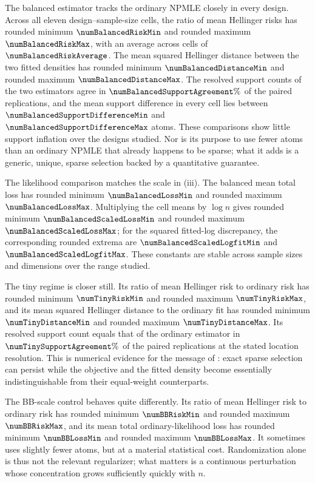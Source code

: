 \documentclass[11pt]{article}
\theoremstyle{definition}
\theoremstyle{remark}
\begin{document}
The balanced estimator tracks the ordinary NPMLE closely in every design.
Across all eleven design--sample-size cells, the ratio of mean Hellinger
risks has rounded minimum $\numBalancedRiskMin$ and rounded maximum $\numBalancedRiskMax$, with an
average across cells of $\numBalancedRiskAverage$.  The mean squared Hellinger distance
between the two fitted densities has rounded minimum $\numBalancedDistanceMin$ and
rounded maximum $\numBalancedDistanceMax$.  The resolved support counts of the two
estimators agree in $\numBalancedSupportAgreement\%$ of the \numPairedDatasets{} paired replications, and the mean
support difference in every cell lies between $\numBalancedSupportDifferenceMin$ and $\numBalancedSupportDifferenceMax$ atoms.
These comparisons show little support inflation over the designs studied.
Nor is its purpose to use fewer atoms than an ordinary NPMLE that already
happens to be sparse; what it adds is a generic, unique, sparse selection
backed by a quantitative guarantee.

The likelihood comparison matches the scale in (iii).  The
balanced mean total loss has rounded minimum $\numBalancedLossMin$ and rounded maximum
$\numBalancedLossMax$.  Multiplying the cell means by $\log n$ gives rounded minimum
$\numBalancedScaledLossMin$ and rounded maximum $\numBalancedScaledLossMax$; for the squared fitted-log discrepancy,
the corresponding rounded extrema are $\numBalancedScaledLogfitMin$ and $\numBalancedScaledLogfitMax$.  These constants
are stable across sample sizes and dimensions over the range studied.

The tiny regime is closer still.  Its ratio of mean Hellinger risk to
ordinary risk has rounded minimum $\numTinyRiskMin$ and rounded maximum $\numTinyRiskMax$,
and its mean squared Hellinger distance to the ordinary fit has rounded
minimum $\numTinyDistanceMin$ and rounded maximum $\numTinyDistanceMax$.  Its
resolved support count equals that of the ordinary estimator in
$\numTinySupportAgreement\%$ of the \numPairedDatasets{} paired replications at
the stated location resolution.  This is numerical evidence for the
message of : exact sparse selection can persist while the
objective and the fitted density become essentially indistinguishable from
their equal-weight counterparts.

The BB-scale control behaves quite differently.  Its ratio of mean Hellinger
risk to ordinary risk has rounded minimum $\numBBRiskMin$ and rounded maximum $\numBBRiskMax$,
and its mean total ordinary-likelihood loss has rounded minimum $\numBBLossMin$ and
rounded maximum $\numBBLossMax$.  It sometimes uses slightly fewer atoms, but at a
material statistical cost.  Randomization alone is thus not the relevant
regularizer; what matters is a continuous perturbation whose concentration
grows sufficiently quickly with $n$.
\end{document}
